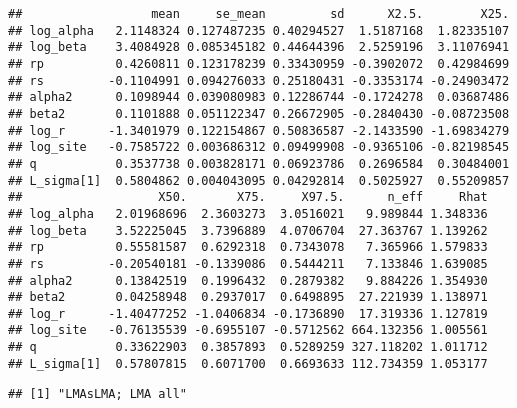 \documentclass[12pt,]{article}
\begin{document}
\begin{verbatim}
##                  mean     se_mean         sd      X2.5.        X25.
## log_alpha   2.1148324 0.127487235 0.40294527  1.5187168  1.82335107
## log_beta    3.4084928 0.085345182 0.44644396  2.5259196  3.11076941
## rp          0.4260811 0.123178239 0.33430959 -0.3902072  0.42984699
## rs         -0.1104991 0.094276033 0.25180431 -0.3353174 -0.24903472
## alpha2      0.1098944 0.039080983 0.12286744 -0.1724278  0.03687486
## beta2       0.1101888 0.051122347 0.26672905 -0.2840430 -0.08723508
## log_r      -1.3401979 0.122154867 0.50836587 -2.1433590 -1.69834279
## log_site   -0.7585722 0.003686312 0.09499908 -0.9365106 -0.82198545
## q           0.3537738 0.003828171 0.06923786  0.2696584  0.30484001
## L_sigma[1]  0.5804862 0.004043095 0.04292814  0.5025927  0.55209857
##                   X50.       X75.     X97.5.      n_eff     Rhat
## log_alpha   2.01968696  2.3603273  3.0516021   9.989844 1.348336
## log_beta    3.52225045  3.7396889  4.0706704  27.363767 1.139262
## rp          0.55581587  0.6292318  0.7343078   7.365966 1.579833
## rs         -0.20540181 -0.1339086  0.5444211   7.133846 1.639085
## alpha2      0.13842519  0.1996432  0.2879382   9.884226 1.354930
## beta2       0.04258948  0.2937017  0.6498895  27.221939 1.138971
## log_r      -1.40477252 -1.0406834 -0.1736890  17.319336 1.127819
## log_site   -0.76135539 -0.6955107 -0.5712562 664.132356 1.005561
## q           0.33622903  0.3857893  0.5289259 327.118202 1.011712
## L_sigma[1]  0.57807815  0.6071700  0.6693633 112.734359 1.053177
\end{verbatim}

\begin{verbatim}
## [1] "LMAsLMA; LMA all"
\end{verbatim}
\end{document}
